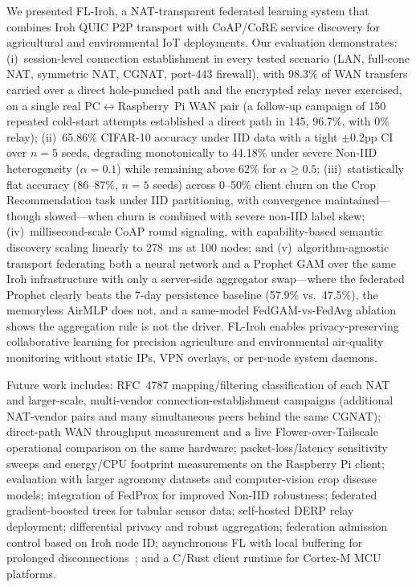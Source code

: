\documentclass[a4paper,fleqn]{cas-dc}
\begin{document}
We presented FL-Iroh, a NAT-transparent federated learning system that combines Iroh QUIC P2P transport with CoAP/CoRE service discovery for agricultural and environmental IoT deployments. Our evaluation demonstrates: (i)~session-level connection establishment in every tested scenario (LAN, full-cone NAT, symmetric NAT, CGNAT, port-443 firewall), with 98.3\% of WAN transfers carried over a direct hole-punched path and the encrypted relay never exercised, on a single real PC$\leftrightarrow$Raspberry~Pi WAN pair (a follow-up campaign of 150 repeated cold-start attempts established a direct path in 145, 96.7\%, with 0\% relay); (ii)~65.86\% CIFAR-10 accuracy under IID data with a tight $\pm$0.2pp CI over $n{=}5$ seeds, degrading monotonically to 44.18\% under severe Non-IID heterogeneity ($\alpha{=}0.1$) while remaining above 62\% for $\alpha{\geq}0.5$; (iii)~statistically flat accuracy (86--87\%, $n{=}5$ seeds) across 0--50\% client churn on the Crop Recommendation task under IID partitioning, with convergence maintained---though slowed---when churn is combined with severe non-IID label skew; (iv)~millisecond-scale CoAP round signaling, with capability-based semantic discovery scaling linearly to 278~ms at 100 nodes; and (v)~algorithm-agnostic transport federating both a neural network and a Prophet GAM over the same Iroh infrastructure with only a server-side aggregator swap---where the federated Prophet clearly beats the 7-day persistence baseline (57.9\% vs.\ 47.5\%), the memoryless AirMLP does not, and a same-model FedGAM-vs-FedAvg ablation shows the aggregation rule is not the driver. FL-Iroh enables privacy-preserving collaborative learning for precision agriculture and environmental air-quality monitoring without static IPs, VPN overlays, or per-node system daemons.

Future work includes: RFC~4787 mapping/filtering classification of each NAT and larger-scale, multi-vendor connection-establishment campaigns (additional NAT-vendor pairs and many simultaneous peers behind the same CGNAT); direct-path WAN throughput measurement and a live Flower-over-Tailscale operational comparison on the same hardware; packet-loss/latency sensitivity sweeps and energy/CPU footprint measurements on the Raspberry Pi client; evaluation with larger agronomy datasets and computer-vision crop disease models; integration of FedProx for improved Non-IID robustness; federated gradient-boosted trees for tabular sensor data; self-hosted DERP relay deployment; differential privacy and robust aggregation; federation admission control based on Iroh node ID; asynchronous FL with local buffering for prolonged disconnections~\cite{fedbuff2022}; and a C/Rust client runtime for Cortex-M MCU platforms.
\end{document}
